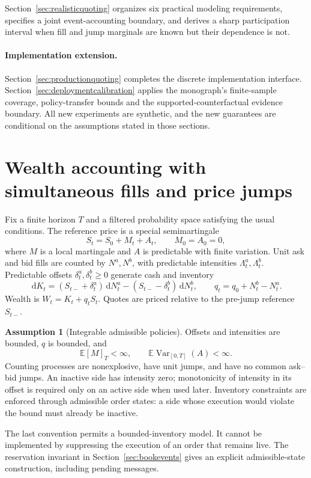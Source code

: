 \documentclass[11pt]{article}
\theoremstyle{plain}
\theoremstyle{definition}
\newtheorem{assumption}[theorem]{Assumption}
\theoremstyle{remark}
\newcommand{\E}{\mathbb E}
\newcommand{\dd}{\,\mathrm d}
\begin{document}
Section~\ref{sec:realisticquoting} organizes six practical modeling requirements, specifies a joint event-accounting boundary, and derives a sharp participation interval when fill and jump marginals are known but their dependence is not.

\paragraph{Implementation extension.}
Section~\ref{sec:productionquoting} completes the discrete implementation interface.
Section~\ref{sec:deploymentcalibration} applies the monograph's finite-sample coverage,
policy-transfer bounds and the supported-counterfactual evidence boundary.
All new experiments are synthetic, and the new guarantees are conditional
on the assumptions stated in those sections.

\section{Wealth accounting with simultaneous fills and price jumps}

Fix a finite horizon \(T\) and a filtered probability space satisfying the
usual conditions. The reference price is a special semimartingale
\[
S_t=S_0+M_t+A_t,\qquad M_0=A_0=0,
\]
where \(M\) is a local martingale and \(A\) is predictable with finite
variation. Unit ask and bid fills are counted by \(N^a,N^b\), with
predictable intensities \(\Lambda^a_t,\Lambda^b_t\).
Predictable offsets \(\delta^a_t,\delta^b_t\ge0\) generate cash and inventory
\[
\dd K_t=(S_{t-}+\delta^a_t)\dd N^a_t
        -(S_{t-}-\delta^b_t)\dd N^b_t,\qquad
q_t=q_0+N^b_t-N^a_t.
\]
Wealth is \(W_t=K_t+q_tS_t\). Quotes are priced relative to the pre-jump
reference \(S_{t-}\).

\begin{assumption}[Integrable admissible policies]\label{ass:accounting}
Offsets and intensities are bounded, \(q\) is bounded, and
\[
\E[M]_T<\infty,\qquad
\E\operatorname{Var}_{[0,T]}(A)<\infty.
\]
Counting processes are nonexplosive, have unit jumps, and have no common
ask--bid jumps. An inactive side has intensity zero; monotonicity of
intensity in its offset is required only on an active side when used
later. Inventory constraints are enforced through admissible order
states: a side whose execution would violate the bound must already
be inactive.
\end{assumption}

The last convention permits a bounded-inventory model. It cannot be
implemented by suppressing the execution of an order that remains live.
The reservation invariant in Section~\ref{sec:bookevents} gives an
explicit admissible-state construction, including pending messages.
\end{document}
